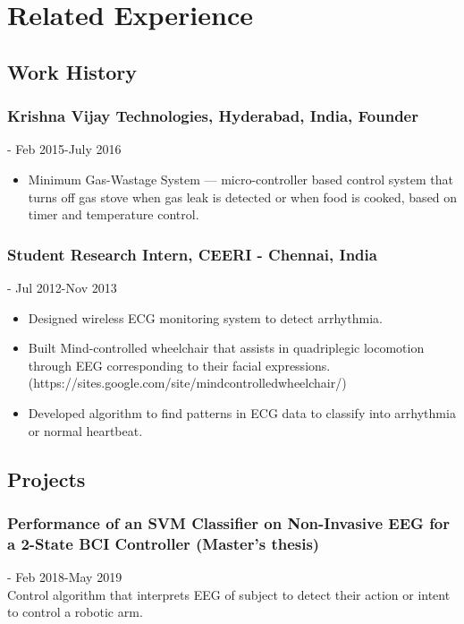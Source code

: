 \documentclass{article}
\begin{document}
\section{Related Experience}
\subsection{Work History}

\subsubsection{Krishna Vijay Technologies, Hyderabad, India, Founder} \hfill - Feb 2015-July 2016
\begin{itemize}
    \item Minimum Gas-Wastage System --- micro-controller based control system that turns off gas stove when gas leak is detected or when food is cooked, based on timer and temperature control.
\end{itemize}
    
\subsubsection{Student Research Intern, CEERI - Chennai, India} \hfill - Jul 2012-Nov 2013
\begin{itemize}
    \item Designed wireless ECG monitoring system to detect arrhythmia.
    \item Built Mind-controlled wheelchair that assists in quadriplegic locomotion through EEG corresponding to their facial expressions.
    (https://sites.google.com/site/mindcontrolledwheelchair/)
    \item Developed algorithm to find patterns in ECG data to classify into arrhythmia or normal heartbeat.
\end{itemize}

\subsection{Projects}
\subsubsection{Performance of an SVM Classifier on Non-Invasive EEG for a 2-State BCI Controller (Master's thesis)} \hfill - Feb 2018-May 2019\\
Control algorithm that interprets EEG of subject to detect their action or intent to control a robotic arm.\\
\end{document}
